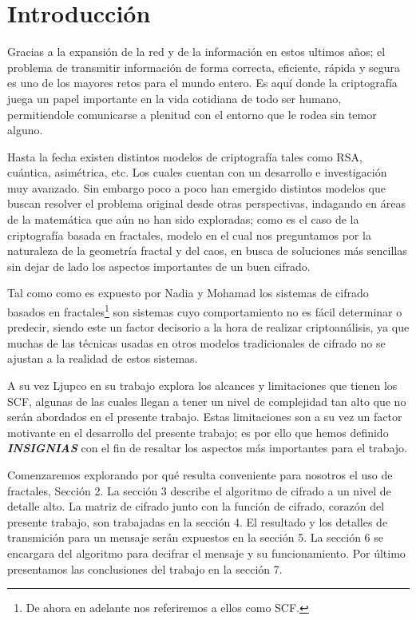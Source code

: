 \section{Introducci\'on}
Gracias a la expansi\'on de la red y de la informaci\'on en estos ultimos a\~nos; el problema de transmitir informaci\'on de forma correcta, eficiente, r\'apida y segura es uno de los mayores retos para el mundo entero. Es aqu\'i donde la criptograf\'ia juega un papel importante en la vida cotidiana de todo ser humano, permitiendole comunicarse a plenitud con el entorno que le rodea sin temor alguno. 

Hasta la fecha existen distintos modelos de criptograf\'ia tales como RSA, cu\'antica, asim\'etrica, etc. Los cuales cuentan con un desarrollo e investigaci\'on muy avanzado. Sin embargo poco a poco han emergido distintos modelos que buscan resolver el problema original desde otras perspectivas, indagando en \'areas de la matem\'atica que a\'un no han sido exploradas; como es el caso de la criptograf\'ia basada en fractales, modelo en el cual nos preguntamos por la naturaleza de la geometr\'ia fractal y del caos, en busca de soluciones m\'as sencillas sin dejar de lado los aspectos importantes de un buen cifrado.

Tal como como es expuesto por Nadia y Mohamad \cite{Nadia} los sistemas de cifrado basados en fractales\footnote{De ahora en adelante nos referiremos a ellos como SCF.} son sistemas cuyo comportamiento no es f\'acil determinar o predecir, siendo este un factor decisorio a la hora de realizar criptoan\'alisis, ya que muchas de las t\'ecnicas usadas en otros modelos tradicionales de cifrado no se ajustan a la realidad de estos sistemas.

A su vez Ljupco \cite{Ljupco} en su trabajo explora los alcances y limitaciones que tienen los SCF, algunas de las cuales llegan a tener un nivel de complejidad tan alto que no ser\'an abordados en el presente trabajo. Estas limitaciones son a su vez un factor motivante en el desarrollo del presente trabajo; es por ello que hemos definido \textbf{\emph{INSIGNIAS}} con el fin de resaltar los aspectos m\'as importantes para el trabajo.

Comenzaremos explorando por qu\'e resulta conveniente para nosotros el uso de fractales, Secci\'on 2. La secci\'on 3 describe el algoritmo de cifrado a un nivel de detalle alto. La matriz de cifrado junto con la funci\'on de cifrado, coraz\'on del presente trabajo, son trabajadas en la secci\'on 4. El resultado y los detalles de transmici\'on para un mensaje ser\'an expuestos en la secci\'on 5. La secci\'on 6 se encargara del algoritmo para decifrar el mensaje y su funcionamiento. Por \'ultimo presentamos las conclusiones del trabajo en la secci\'on 7.

